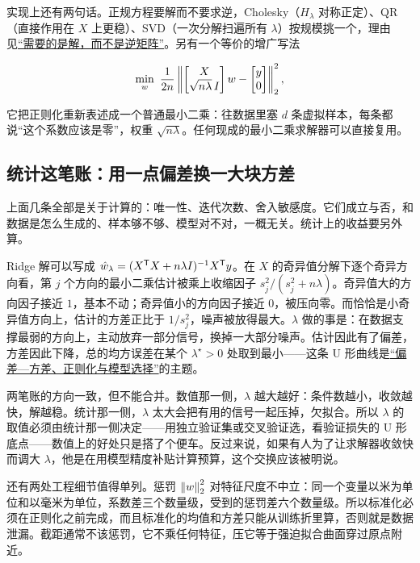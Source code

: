 实现上还有两句话。正规方程要解而不要求逆，Cholesky（\(H_\lambda\) 对称正定）、QR（直接作用在 \(X\) 上更稳）、SVD（一次分解扫遍所有 \(\lambda\)）按规模挑一个，理由见\hyperref[sec:08-Numerical-Analysis/07-Numerical-Methods-for-ML/03]{``需要的是解，而不是逆矩阵''}。另有一个等价的增广写法

\[
\min_w\ \frac{1}{2n}\norm{\begin{bmatrix}X\\ \sqrt{n\lambda}\,I\end{bmatrix}w-\begin{bmatrix}y\\ 0\end{bmatrix}}_2^2,
\]

它把正则化重新表述成一个普通最小二乘：往数据里塞 \(d\) 条虚拟样本，每条都说``这个系数应该是零''，权重 \(\sqrt{n\lambda}\)。任何现成的最小二乘求解器可以直接复用。

\subsection{统计这笔账：用一点偏差换一大块方差}

上面几条全部是关于计算的：唯一性、迭代次数、舍入敏感度。它们成立与否，和数据是怎么生成的、样本够不够、模型对不对，一概无关。统计上的收益要另外算。

Ridge 解可以写成 \(\hat w_\lambda=(X^{\mathsf{T}}X+n\lambda I)^{-1}X^{\mathsf{T}}y\)。在 \(X\) 的奇异值分解下逐个奇异方向看，第 \(j\) 个方向的最小二乘估计被乘上收缩因子 \(s_j^2/(s_j^2+n\lambda)\)。奇异值大的方向因子接近 \(1\)，基本不动；奇异值小的方向因子接近 \(0\)，被压向零。而恰恰是小奇异值方向上，估计的方差正比于 \(1/s_j^2\)，噪声被放得最大。\(\lambda\) 做的事是：在数据支撑最弱的方向上，主动放弃一部分信号，换掉一大部分噪声。估计因此有了偏差，方差因此下降，总的均方误差在某个 \(\lambda^\star>0\) 处取到最小——这条 U 形曲线是\hyperref[sec:11-Mathematical-Statistics/06-Resampling-and-Model-Selection/04]{``偏差---方差、正则化与模型选择''}的主题。

两笔账的方向一致，但不能合并。数值那一侧，\(\lambda\) 越大越好：条件数越小，收敛越快，解越稳。统计那一侧，\(\lambda\) 太大会把有用的信号一起压掉，欠拟合。所以 \(\lambda\) 的取值必须由统计那一侧决定——用独立验证集或交叉验证选，看验证损失的 U 形底点——数值上的好处只是搭了个便车。反过来说，如果有人为了让求解器收敛快而调大 \(\lambda\)，他是在用模型精度补贴计算预算，这个交换应该被明说。

还有两处工程细节值得单列。惩罚 \(\left\lVert w\right\rVert_2^2\) 对特征尺度不中立：同一个变量以米为单位和以毫米为单位，系数差三个数量级，受到的惩罚差六个数量级。所以标准化必须在正则化之前完成，而且标准化的均值和方差只能从训练折里算，否则就是数据泄漏。截距通常不该惩罚，它不乘任何特征，压它等于强迫拟合曲面穿过原点附近。

